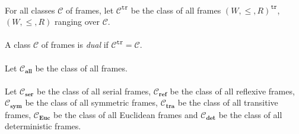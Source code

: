 \documentclass[draft]{article}
\def\allfra{\mathbf{all}}
\def\sym{\mathbf{sym}}
\def\deterministic{\mathbf{det}}
\def\Euclidean{\mathbf{Euc}}
\def\reflexive{\mathbf{ref}}
\def\transitive{\mathbf{tra}}
\def\serial{\mathbf{ser}}
\begin{document}
\\
%
%
For all classes ${\mathcal C}$ of frames, let ${\mathcal C}^{\mathtt{tr}}$ be the class of all frames $(W,{\leq},{R})^{\mathtt{tr}}$, $(W,{\leq},{R})$ ranging over ${\mathcal C}$.
%
%
\\
\\
%
%
A class ${\mathcal C}$ of frames is {\em dual}\/ if ${\mathcal C}^{\mathtt{tr}}{=}{\mathcal C}$.
%
%
\\
\\
%
%
Let ${\mathcal C}_{\allfra}$ be the class of all frames.
%
%
\\
\\
%
%
Let ${\mathcal C}_{\serial}$ be the class of all serial frames, ${\mathcal C}_{\reflexive}$ be the class of all reflexive frames, ${\mathcal C}_{\sym}$ be the class of all symmetric frames, ${\mathcal C}_{\transitive}$ be the class of all transitive frames, ${\mathcal C}_{\Euclidean}$ be the class of all Euclidean frames and ${\mathcal C}_{\deterministic}$ be the class of all deterministic frames.
%
%
%
%
\end{document}
